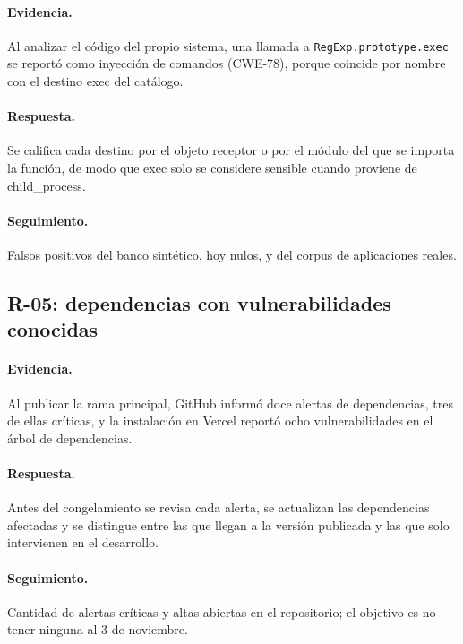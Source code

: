 \paragraph{Evidencia.} Al analizar el código del propio sistema, una llamada a \texttt{RegExp.\allowbreak prototype.\allowbreak exec} se reportó como inyección de comandos (CWE-78), porque coincide por nombre con el destino exec del catálogo.

\paragraph{Respuesta.} Se califica cada destino por el objeto receptor o por el módulo del que se importa la función, de modo que exec solo se considere sensible cuando proviene de child\_process.

\paragraph{Seguimiento.} Falsos positivos del banco sintético, hoy nulos, y del corpus de aplicaciones reales.

\subsection{R-05: dependencias con vulnerabilidades conocidas}\label{sec:n6.4.5}

\paragraph{Evidencia.} Al publicar la rama principal, GitHub informó doce alertas de dependencias, tres de ellas críticas, y la instalación en Vercel reportó ocho vulnerabilidades en el árbol de dependencias.

\paragraph{Respuesta.} Antes del congelamiento se revisa cada alerta, se actualizan las dependencias afectadas y se distingue entre las que llegan a la versión publicada y las que solo intervienen en el desarrollo.

\paragraph{Seguimiento.} Cantidad de alertas críticas y altas abiertas en el repositorio; el objetivo es no tener ninguna al 3 de noviembre.


